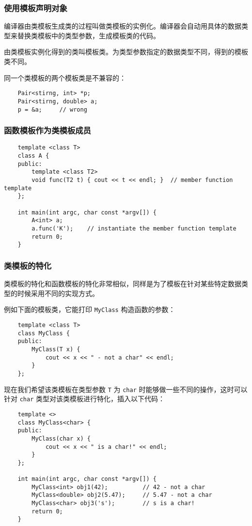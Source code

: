 \documentclass[UTF8]{ctexart}
\begin{document}
\subsubsection{使用模板声明对象}
编译器由类模板生成类的过程叫做类模板的实例化。编译器会自动用具体的数据类型来替换类模板中的类型参数，生成模板类的代码。

由类模板实例化得到的类叫模板类。为类型参数指定的数据类型不同，得到的模板类不同。

同一个类模板的两个模板类是不兼容的：
\begin{verbatim}
    Pair<stirng, int> *p;
    Pair<stirng, double> a;
    p = &a;     // wrong
\end{verbatim}

\subsubsection{函数模板作为类模板成员}
\begin{verbatim}
    template <class T>
    class A {
    public:
        template <class T2>
        void func(T2 t) { cout << t << endl; }  // member function template
    };

    int main(int argc, char const *argv[]) {
        A<int> a;
        a.func('K');    // instantiate the member function template
        return 0;
    }
\end{verbatim}

\subsubsection{类模板的特化}
类模板的特化和函数模板的特化非常相似，同样是为了模板在针对某些特定数据类型的时候采用不同的实现方式。

例如下面的模板类，它能打印 \texttt{MyClass} 构造函数的参数：
\begin{verbatim}
    template <class T>
    class MyClass {
    public:
        MyClass(T x) {
            cout << x << " - not a char" << endl;
        }
    };
\end{verbatim}

现在我们希望该类模板在类型参数 \texttt{T} 为 \texttt{char} 时能够做一些不同的操作，这时可以针对 \texttt{char}
类型对该类模板进行特化，插入以下代码：
\begin{verbatim}
    template <>
    class MyClass<char> {
    public:
        MyClass(char x) {
            cout << x << " is a char!" << endl;
        }
    };

    int main(int argc, char const *argv[]) {
        MyClass<int> obj1(42);          // 42 - not a char
        MyClass<double> obj2(5.47);     // 5.47 - not a char
        MyClass<char> obj3('s');        // s is a char!
        return 0;
    }
\end{verbatim}
\end{document}
